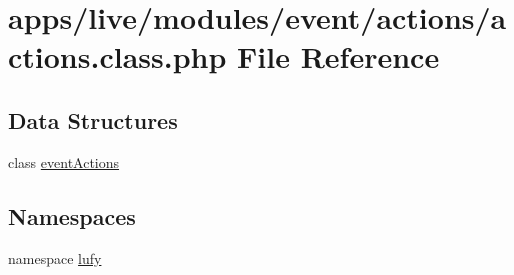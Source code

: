 \hypertarget{live_2modules_2event_2actions_2actions_8class_8php}{\section{apps/live/modules/event/actions/actions.class.\-php File Reference}
\label{live_2modules_2event_2actions_2actions_8class_8php}
}
\subsection*{Data Structures}
\begin{DoxyCompactItemize}
\item 
class \hyperlink{classevent_actions}{event\-Actions}
\end{DoxyCompactItemize}
\subsection*{Namespaces}
\begin{DoxyCompactItemize}
\item 
namespace \hyperlink{namespacelufy}{lufy}
\end{DoxyCompactItemize}
